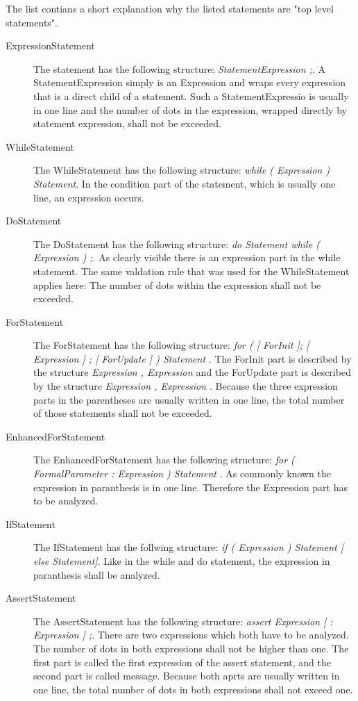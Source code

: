 The list contians a short explanation why the listed statements are "top level statements".
\\

\begin{description}
  \item[ExpressionStatement] The statement has the following structure: \textit{ StatementExpression ;}. A StatementExpression simply is an Expression and wraps every expression that is a direct child of a statement. Such a StatementExpressio is usually in one line and the number of dots in the expression, wrapped directly by statement expression, shall not be exceeded.
  \item[WhileStatement] The WhileStatement  has the following structure: \textit{while ( Expression ) Statement}. In the condition part of the statement, which is usually one line, an expression occurs.
  \item[DoStatement] The DoStatement has the following structure: \textit{do Statement while ( Expression ) ;}. As clearly visible there is an expression part in the while statement. The same valdation rule that was used for the WhileStatement applies here: The number of dots within the expression shall not be exceeded.
  \item[ForStatement] The ForStatement has the following structure: \textit{for ( [ ForInit ]; [ Expression ] ; [ ForUpdate ] ) Statement  
  }. The ForInit part is described by the structure \textit{Expression { , Expression }} and the ForUpdate  part is described by the structure \textit{ Expression { , Expression }}. Because the three expression parts in the parentheses are usually written in one line, the total number of those statements shall not be exceeded.
  \item[EnhancedForStatement] The EnhancedForStatement has the following structure: \textit{for ( FormalParameter : Expression ) Statement }. As commonly known the expression in paranthesis is in one line. Therefore the Expression part has to be analyzed.
  \item[IfStatement] The IfStatement has the follwing structure: \textit{if ( Expression ) Statement [ else Statement]}. Like in the while and do statement, the expression in paranthesis shall be analyzed. 
  \item[AssertStatement] The AssertStatement  has the following structure: \textit{assert Expression [ : Expression ] ;}. There are two expressions which both have to be analyzed. The number of dots in both expressions shall not be higher than one. The first part is called the first expression of the assert statement, and the second part is called message. Because both aprts are usually written in one line, the total number of dots in both expressions shall not exceed one.

\end{description}
